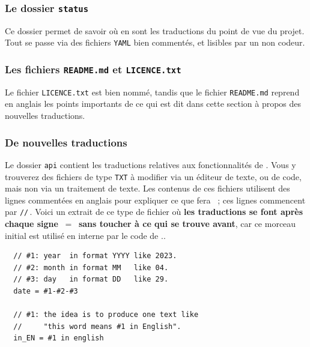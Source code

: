 \documentclass{tutodoc}
\begin{document}
\subsubsection{Le dossier \texttt{status}}

Ce dossier permet de savoir où en sont les traductions du point de vue du projet. Tout se passe via des fichiers \verb#YAML# bien commentés, et lisibles par un non codeur.



\subsubsection{Les fichiers \texttt{README.md} et \texttt{LICENCE.txt}}

Le fichier \texttt{LICENCE.txt} est bien nommé, tandis que le fichier \texttt{README.md} reprend en anglais les points importants de ce qui est dit dans cette section à propos des nouvelles traductions.



\subsubsection{De nouvelles traductions}
\label{tutodoc-contrib-translate}

\begin{tdocimp}
    Le dossier \verb#api# contient les traductions relatives aux fonctionnalités de \thisproj.
    Vous y trouverez des fichiers de type \verb#TXT# à modifier via un éditeur de texte, ou de code, mais non via un traitement de texte.
    Les contenus de ces fichiers utilisent des lignes commentées en anglais pour expliquer ce que fera \thisproj\ ; ces lignes commencent par \verb#//#\,. Voici un extrait de ce type de fichier où \textbf{les traductions se font après chaque signe \,$=$\, sans toucher à ce qui se trouve avant}, car ce morceau initial est utilisé en interne par le code de \thisproj..

    \tdocsep
    \vspace{-10pt}
    \begin{verbatim}
  // #1: year  in format YYYY like 2023.
  // #2: month in format MM   like 04.
  // #3: day   in format DD   like 29.
  date = #1-#2-#3

  // #1: the idea is to produce one text like
  //     "this word means #1 in English".
  in_EN = #1 in english\end{verbatim}
\end{tdocimp}
\end{document}
